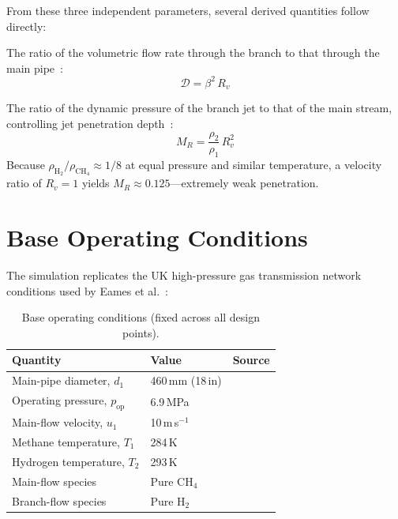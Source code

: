 \documentclass[12pt,a4paper]{report}
\begin{document}
\noindent From these three independent parameters, several derived quantities
follow directly:

\begin{description}[style=nextline, font=\normalfont\bfseries, leftmargin=1.5em]

  \item[Volumetric dilution ($\mathcal{D}$):]
  The ratio of the volumetric flow rate through the branch to that through the
  main pipe~\cite{Eames2022}:
  \begin{equation}
    \mathcal{D} = \beta^{2}\, R_v
    \label{eq:dilution}
  \end{equation}

  \item[Momentum ratio ($M_R$):]
  The ratio of the dynamic pressure of the branch jet to that of the main
  stream, controlling jet penetration depth~\cite{Eames2022}:
  \begin{equation}
    M_R = \frac{\rho_2}{\rho_1}\, R_v^{2}
    \label{eq:momratio}
  \end{equation}
  Because $\rho_{\mathrm{H_2}} / \rho_{\mathrm{CH_4}} \approx 1/8$ at equal
  pressure and similar temperature, a velocity ratio of $R_v = 1$ yields
  $M_R \approx 0.125$---extremely weak penetration.

\end{description}


\section{Base Operating Conditions}

The simulation replicates the UK high-pressure gas transmission network
conditions used by Eames et al.~\cite{Eames2022}:

\begin{table}[H]
\centering
\caption{Base operating conditions (fixed across all design points).}
\label{tab:opcond}
\begin{tabular}{@{}lll@{}}
\toprule
\textbf{Quantity} & \textbf{Value} & \textbf{Source} \\
\midrule
Main-pipe diameter, $d_1$            & 460\,mm (18\,in)     & \cite{Eames2022} \\
Operating pressure, $p_{\text{op}}$  & 6.9\,MPa             & \cite{Eames2022} \\
Main-flow velocity, $u_1$            & 10\,m\,s$^{-1}$      & \cite{Eames2022} \\
Methane temperature, $T_1$           & 284\,K               & \cite{Eames2022} \\
Hydrogen temperature, $T_2$          & 293\,K               & \cite{Eames2022} \\
Main-flow species                    & Pure CH$_4$           & \cite{Eames2022} \\
Branch-flow species                  & Pure H$_2$            & \cite{Eames2022} \\
\bottomrule
\end{tabular}
\end{table}
\end{document}
